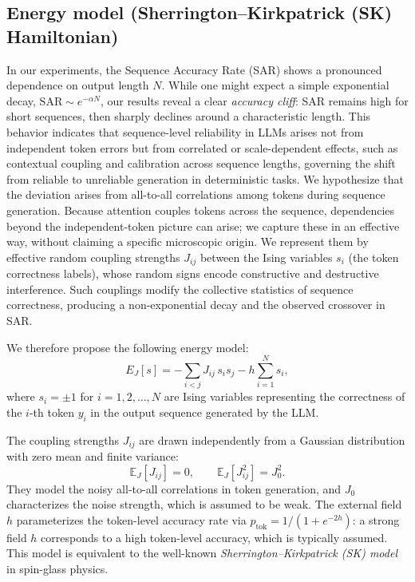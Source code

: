 \documentclass{article}
\theoremstyle{plain}
\begin{document}
\subsection{Energy model (Sherrington--Kirkpatrick (SK) Hamiltonian)}\label{app:sk}

In our experiments, the Sequence Accuracy Rate (SAR) shows a pronounced dependence on output length \(N\).
While one might expect a simple exponential decay, \(\mathrm{SAR} \sim e^{-\alpha N}\), our results reveal a clear \emph{accuracy cliff}: SAR remains high for short sequences, then sharply declines around a characteristic length.
This behavior indicates that sequence-level reliability in LLMs arises not from independent token errors but from correlated or scale-dependent effects, such as contextual coupling and calibration across sequence lengths, governing the shift from reliable to unreliable generation in deterministic tasks.
We hypothesize that the deviation arises from all-to-all correlations among tokens during sequence generation.
Because attention couples tokens across the sequence, dependencies beyond the independent-token picture can arise; we capture these in an effective way, without claiming a specific microscopic origin.
We represent them by effective random coupling strengths \(J_{ij}\) between the Ising variables \(s_i\) (the token correctness labels), whose random signs encode constructive and destructive interference.
Such couplings modify the collective statistics of sequence correctness, producing a non-exponential decay and the observed crossover in SAR.

We therefore propose the following energy model:
\begin{equation}
E_J[s] = -\sum_{i<j} J_{ij}\, s_i s_j - h \sum_{i=1}^{N} s_i,
\end{equation}
where \(s_i = \pm 1\) for \(i = 1, 2, \ldots, N\) are Ising variables representing the correctness of the \(i\)-th token \(y_i\) in the output sequence generated by the LLM.

The coupling strengths \(J_{ij}\) are drawn independently from a Gaussian distribution with zero mean and finite variance:
\begin{equation}
\mathbb{E}_J[J_{ij}] = 0,
\qquad
\mathbb{E}_J[J_{ij}^2] = J_0^2.
\end{equation}
They model the noisy all-to-all correlations in token generation, and \(J_0\) characterizes the noise strength, which is assumed to be weak.
The external field \(h\) parameterizes the token-level accuracy rate via \(p_{\mathrm{tok}}=1/(1+e^{-2h})\): a strong field \(h\) corresponds to a high token-level accuracy, which is typically assumed. This model is equivalent to the well-known \emph{Sherrington--Kirkpatrick (SK) model} in spin-glass physics.
\end{document}
